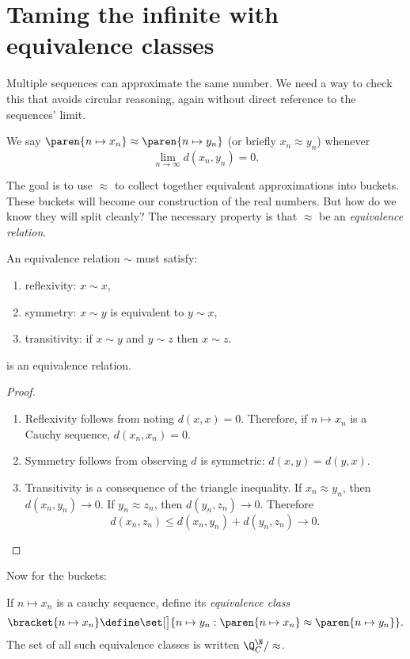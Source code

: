 \documentclass{scrartcl}
\newcommand{\dist}{d}
\begin{document}
\section{Taming the infinite with equivalence classes}
Multiple sequences can approximate the same number. We need a way to check this that avoids circular reasoning, again without direct reference to the sequences' limit.
\begin{defn}[\(\approx\)]\label{cauchy-eq}
  We say \(\paren{n\mapsto x_{n}}\approx\paren{n\mapsto  y_{n}}\) (or briefly \(x_{n}\approx y_{n}\)) whenever
  \[
    \lim_{{n\to\infty}} \dist(x_{n},y_{n}) = 0.
  \]
\end{defn}

The goal is to use \(\approx\) to collect together equivalent approximations into buckets. These buckets will become our construction of the real numbers. But how do we know they will split cleanly? The necessary property is that \(\approx\) be an \emph{equivalence relation}.
\begin{defn}
  An equivalence relation \(\sim\) must satisfy:
  \begin{enumerate}
    \item reflexivity: \(x\sim x\),
    \item symmetry: \(x\sim y\) is equivalent to \(y\sim x\),
    \item transitivity: if \(x\sim y\) and \(y \sim z\) then \(x\sim z\).
  \end{enumerate}
\end{defn}
\begin{theorem}
   is an equivalence relation.
\end{theorem}
\begin{proof}
  \phantom{M}
  \begin{enumerate}
    \item Reflexivity follows from noting \(\dist(x,x)=0\). Therefore, if \(n \mapsto x_{n}\) is a Cauchy sequence, \(\dist(x_{n},x_{n})=0\).

    \item Symmetry follows from observing \(\dist\) is symmetric: \(\dist(x,y)=\dist(y,x)\).
    \item Transitivity is a consequence of the triangle inequality.
          If \(x_{n}\approx y_{n}\), then \(\dist(x_{n},y_{n})\to 0\). If \(y_{n}\approx z_{n}\), then \(\dist(y_{n},z_{n})\to 0\). Therefore
          \[
          \dist(x_{n},z_{n}) \leq \dist(x_{n},y_{n}) + \dist(y_{n},z_{n}) \to 0.
          \]
  \end{enumerate}
\end{proof}
Now for the buckets:
\begin{defn}
  If \(n\mapsto x_{n}\) is a cauchy sequence, define its \emph{equivalence class}
  \[
    \bracket{n\mapsto x_{n}} \define \set[\big]{n\mapsto y_{n}: \paren{n\mapsto x_{n}}\approx \paren{n\mapsto y_{n}}}.
  \]
  The set of all such equivalence classes is written \(\Q^{\N}_{C}/\approx\).
\end{defn}
\end{document}
